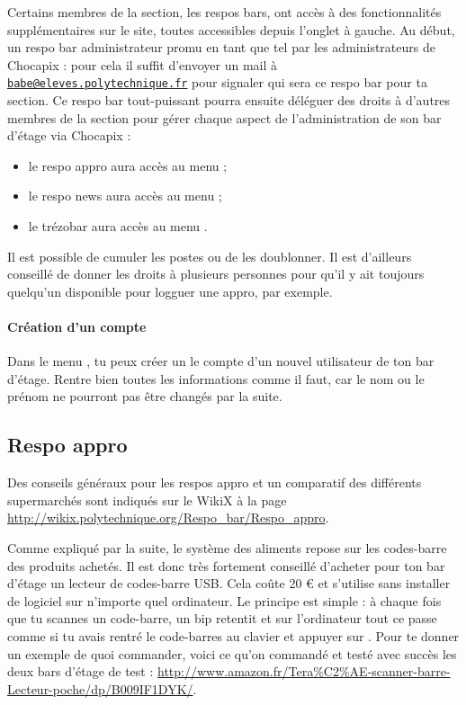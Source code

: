 \documentclass[12pt,french]{article}
\begin{document}
Certains membres de la section, les respos bars, ont accès à des fonctionnalités supplémentaires sur le site, toutes accessibles depuis l'onglet  à gauche. Au début, un respo bar administrateur promu en tant que tel par les administrateurs de Chocapix : pour cela il suffit d'envoyer un mail à \href{mailto:babe@eleves.polytechnique.fr}{\texttt{babe@eleves.polytechnique.fr}} pour signaler qui sera ce respo bar pour ta section. Ce respo bar tout-puissant pourra ensuite déléguer des droits à d'autres membres de la section pour gérer chaque aspect de l'administration de son bar d'étage via Chocapix :
\begin{itemize}
	\item le respo appro aura accès au menu  ;
	\item le respo news aura accès au menu  ;
	\item le trézobar aura accès au menu .
\end{itemize}
Il est possible de cumuler les postes ou de les doublonner. Il est d'ailleurs conseillé de donner les droits à plusieurs personnes pour qu'il y ait toujours quelqu'un disponible pour logguer une appro, par exemple.

\paragraph{Création d'un compte} Dans le menu , tu peux créer un le compte d'un nouvel utilisateur de ton bar d'étage. Rentre bien toutes les informations comme il faut, car le nom ou le prénom ne pourront pas être changés par la suite.

\subsection{Respo appro}

Des conseils généraux pour les respos appro et un comparatif des différents supermarchés sont indiqués sur le WikiX à la page \url{http://wikix.polytechnique.org/Respo_bar/Respo_appro}.

Comme expliqué par la suite, le système des aliments repose sur les codes-barre des produits achetés. Il est donc très fortement conseillé d'acheter pour ton bar d'étage un lecteur de codes-barre USB. Cela coûte 20 € et s'utilise sans installer de logiciel sur n'importe quel ordinateur. Le principe est simple : à chaque fois que tu scannes un code-barre, un bip retentit et sur l'ordinateur tout ce passe comme si tu avais rentré le code-barres au clavier et appuyer sur . Pour te donner un exemple de quoi commander, voici ce qu'on commandé et testé avec succès les deux bars d'étage de test : \url{http://www.amazon.fr/Tera%C2%AE-scanner-barre-Lecteur-poche/dp/B009IF1DYK/}.
\end{document}
